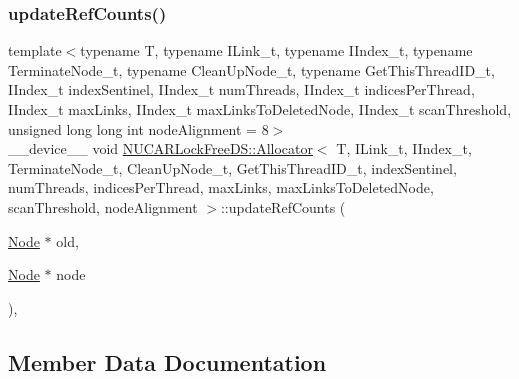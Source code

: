 \subsubsection{\texorpdfstring{update\+Ref\+Counts()}{updateRefCounts()}}
{\footnotesize\ttfamily template$<$typename T, typename I\+Link\+\_\+t, typename I\+Index\+\_\+t, typename Terminate\+Node\+\_\+t, typename Clean\+Up\+Node\+\_\+t, typename Get\+This\+Thread\+I\+D\+\_\+t, I\+Index\+\_\+t index\+Sentinel, I\+Index\+\_\+t num\+Threads, I\+Index\+\_\+t indices\+Per\+Thread, I\+Index\+\_\+t max\+Links, I\+Index\+\_\+t max\+Links\+To\+Deleted\+Node, I\+Index\+\_\+t scan\+Threshold, unsigned long long int node\+Alignment = 8$>$ \\
\+\_\+\+\_\+device\+\_\+\+\_\+ void \mbox{\hyperlink{class_n_u_c_a_r_lock_free_d_s_1_1_allocator}{N\+U\+C\+A\+R\+Lock\+Free\+D\+S\+::\+Allocator}}$<$ T, I\+Link\+\_\+t, I\+Index\+\_\+t, Terminate\+Node\+\_\+t, Clean\+Up\+Node\+\_\+t, Get\+This\+Thread\+I\+D\+\_\+t, index\+Sentinel, num\+Threads, indices\+Per\+Thread, max\+Links, max\+Links\+To\+Deleted\+Node, scan\+Threshold, node\+Alignment $>$\+::update\+Ref\+Counts (\begin{DoxyParamCaption}\item[{\mbox{\hyperlink{class_n_u_c_a_r_lock_free_d_s_1_1_allocator_1_1_node}{Node}} $\ast$}]{old,  }\item[{\mbox{\hyperlink{class_n_u_c_a_r_lock_free_d_s_1_1_allocator_1_1_node}{Node}} $\ast$}]{node }\end{DoxyParamCaption})\hspace{0.3cm}{\ttfamily [inline]}, {\ttfamily [private]}}



\subsection{Member Data Documentation}
\mbox{\label{class_n_u_c_a_r_lock_free_d_s_1_1_allocator_ae185b38ec0a4ca4ccbe4ec0060ca834b}} 
